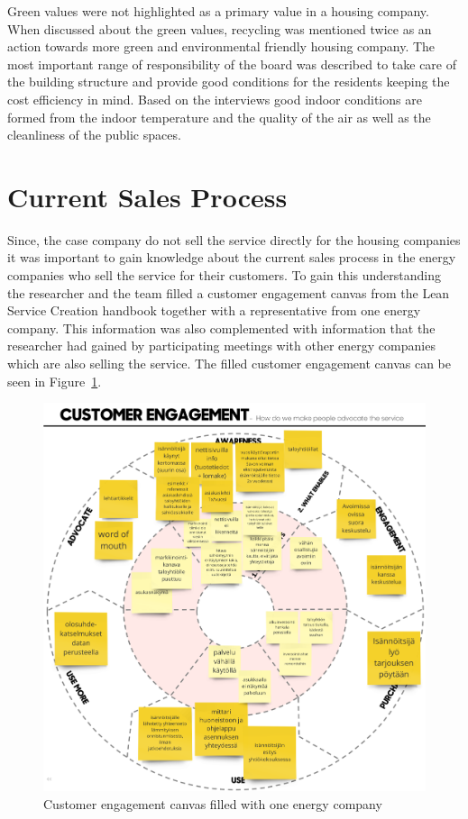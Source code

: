 Green values were not highlighted as a primary value in a housing company. When discussed about the green values, recycling was mentioned twice as an action towards more green and environmental friendly housing company. The most important range of responsibility of the board was described to take care of the building structure and provide good conditions for the residents keeping the cost efficiency in mind. Based on the interviews good indoor conditions are formed from the indoor temperature and the quality of the air as well as the cleanliness of the public spaces.

\section{Current Sales Process}

Since, the case company do not sell the service directly for the housing companies it was important to gain knowledge about the current sales process in the energy companies who sell the service for their customers. To gain this understanding the researcher and the team filled a customer engagement canvas from the Lean Service Creation handbook together with a representative from one energy company. This information was also complemented with information that the researcher had gained by participating meetings with other energy companies which are also selling the service. The filled customer engagement canvas can be seen in Figure~\ref{fig:customer-engagement}.

\begin{figure}[hbt!]
  \begin{center}
    \includegraphics[width=\textwidth]{dippa/images/customer-engagement.png}
    \caption{Customer engagement canvas filled with one energy company}
    \label{fig:customer-engagement}
  \end{center}
\end{figure}

